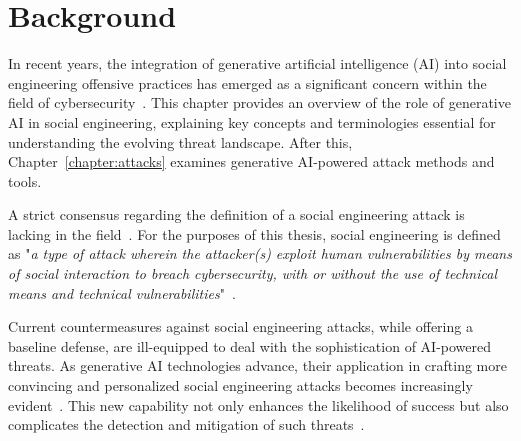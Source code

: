 

    

\chapter{Background\label{chapter:definition}}
\begin{comment}

Guides:
    - Pages: 2-3
    - Context and terminology (käsitteet), challenges and measurement criteria, values, research question analysis
    - Tarkentaa tavoiteet ja osakysymykset, vertailukriteerit (jotka jäsentävät muita lukuja)

TODO:
    [ ] 

What to cover:
    - What is cybersecurity and why it's of paramount importance
    - What is social engineering
        - Brief history of social engineering
            - Phishing in 1996 via AOL
    - Attacks, classical social engineering attacks
        - Phishing, vishing, smishing
    - Countermeasures, classical
        - User awareness & training programs
        - Company policy & company culture
    - Typical challenges

\end{comment}

In recent years, the integration of generative artificial intelligence (AI) into social engineering offensive practices has emerged as a significant concern within the field of cybersecurity~\citep{blauth_AI_Crime_Overview_Malicious_Use_Abuse_2022, king_AI_Crime_Interdisciplinary_Analysis_2019}. This chapter provides an overview of the role of generative AI in social engineering, explaining key concepts and terminologies essential for understanding the evolving threat landscape. After this, Chapter~\ref{chapter:attacks} examines generative AI-powered attack methods and tools.

A strict consensus regarding the definition of a social engineering attack is lacking in the field~\citep{hatfield_SE_Evolution_Concept_2018}. For the purposes of this thesis, social engineering is defined as "\textit{a type of attack wherein the attacker(s) exploit human vulnerabilities by means of social interaction to breach cybersecurity, with or without the use of technical means and technical vulnerabilities}"~\citep{wang_Defining_Social_Engineering_2020}.

Current countermeasures against social engineering attacks, while offering a baseline defense, are ill-equipped to deal with the sophistication of AI-powered threats. As generative AI technologies advance, their application in crafting more convincing and personalized social engineering attacks becomes increasingly evident~\citep{blauth_AI_Crime_Overview_Malicious_Use_Abuse_2022}. This new capability not only enhances the likelihood of success but also complicates the detection and mitigation of such threats~\citep{basit_Comprehensive_Survey_AI_Phishing_Detection_2021}.

